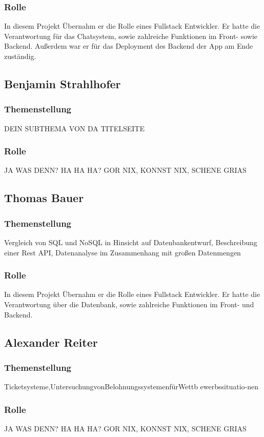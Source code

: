 \subsubsection{Rolle}
In diesem Projekt Übernahm er die Rolle eines Fullstack Entwickler. Er hatte die Verantwortung für das Chatsystem,
sowie zahlreiche Funktionen im Front- sowie Backend. Außerdem war er für das Deployment des Backend der App am Ende zuständig.

\subsection{Benjamin Strahlhofer}
\subsubsection{Themenstellung}
DEIN SUBTHEMA VON DA TITELSEITE
\subsubsection{Rolle}
JA WAS DENN? HA HA HA? GOR NIX, KONNST NIX, SCHENE GRIAS

\subsection{Thomas Bauer}
\subsubsection{Themenstellung}
Vergleich von SQL und NoSQL in Hinsicht auf Datenbankentwurf, Beschreibung einer Rest API, Datenanalyse im Zusammenhang mit großen Datenmengen
\subsubsection{Rolle}
In diesem Projekt Übernahm er die Rolle eines Fullstack Entwickler. Er hatte die Verantwortung über die Datenbank, 
sowie zahlreiche Funktionen im Front- und Backend. 

\subsection{Alexander Reiter}
\subsubsection{Themenstellung}
Ticketsysteme,UntersuchungvonBelohnungssystemenfürWettb ewerbssituatio-nen
\subsubsection{Rolle}
JA WAS DENN? HA HA HA? GOR NIX, KONNST NIX, SCHENE GRIAS

\newpage